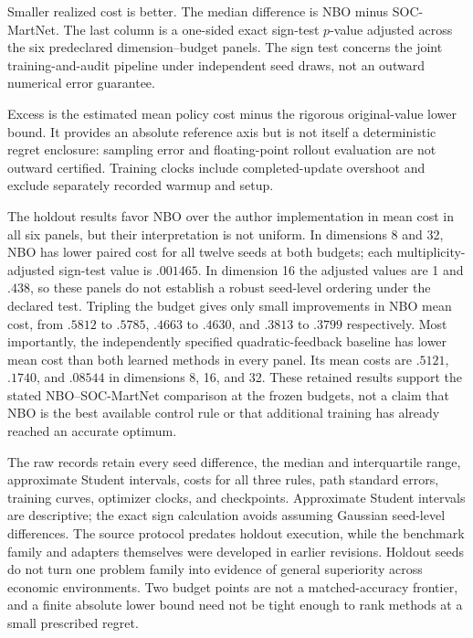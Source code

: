 \begin{table}[t]\centering\scriptsize
\caption{Frozen holdout comparison: twelve seed pairs per panel}\label{r9:tab:external}

\par\smallskip\footnotesize Smaller realized cost is better. The median difference is NBO minus SOC-MartNet. The last column is a one-sided exact sign-test $p$-value adjusted across the six predeclared dimension--budget panels. The sign test concerns the joint training-and-audit pipeline under independent seed draws, not an outward numerical error guarantee.
\end{table}
\begin{table}[t]\centering\scriptsize
\caption{Absolute reference excess and actual training clocks}\label{r9:tab:externalabsolute}

\par\smallskip\footnotesize Excess is the estimated mean policy cost minus the rigorous original-value lower bound. It provides an absolute reference axis but is not itself a deterministic regret enclosure: sampling error and floating-point rollout evaluation are not outward certified. Training clocks include completed-update overshoot and exclude separately recorded warmup and setup.
\end{table}


The holdout results favor NBO over the author implementation in mean cost in all six panels, but their interpretation is not uniform. In dimensions 8 and 32, NBO has lower paired cost for all twelve seeds at both budgets; each multiplicity-adjusted sign-test value is $.001465$. In dimension 16 the adjusted values are 1 and $.438$, so these panels do not establish a robust seed-level ordering under the declared test. Tripling the budget gives only small improvements in NBO mean cost, from $.5812$ to $.5785$, $.4663$ to $.4630$, and $.3813$ to $.3799$ respectively. Most importantly, the independently specified quadratic-feedback baseline has lower mean cost than both learned methods in every panel. Its mean costs are $.5121$, $.1740$, and $.08544$ in dimensions 8, 16, and 32. These retained results support the stated NBO--SOC-MartNet comparison at the frozen budgets, not a claim that NBO is the best available control rule or that additional training has already reached an accurate optimum.

The raw records retain every seed difference, the median and interquartile range, approximate Student intervals, costs for all three rules, path standard errors, training curves, optimizer clocks, and checkpoints. Approximate Student intervals are descriptive; the exact sign calculation avoids assuming Gaussian seed-level differences. The source protocol predates holdout execution, while the benchmark family and adapters themselves were developed in earlier revisions. Holdout seeds do not turn one problem family into evidence of general superiority across economic environments. Two budget points are not a matched-accuracy frontier, and a finite absolute lower bound need not be tight enough to rank methods at a small prescribed regret.

